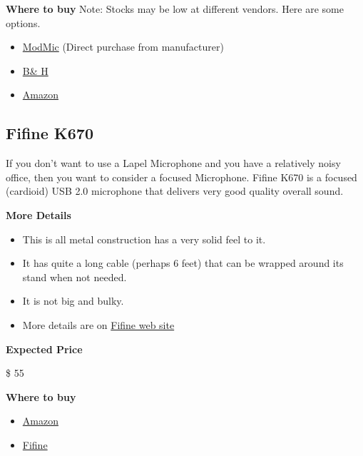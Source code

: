 \begin{gram}
\textbf{Where to buy}
Note: Stocks may be low at different vendors. Here are some options.

\begin{itemize}
	\item \href{https://antlionaudio.com/collections/microphones}{ModMic} (Direct purchase from manufacturer)
	\item \href{https://www.bhphotovideo.com/c/search?Ntt=modmic&N=0&InitialSearch=yes&sts=ma}{B\& H}
	\item \href{https://www.amazon.com/s?k=modmic&ref=nb_sb_noss_1}{Amazon}
\end{itemize}

\end{gram}

\subsection{Fifine K670}
\label{sec:equipment::fifine}

\begin{gram}
\label{grm:equipment::fifine::main}
If you don't want to use a Lapel Microphone and you have a relatively
noisy office, then you want to consider a focused Microphone.
Fifine K670 is a focused (cardioid) USB 2.0 microphone that
delivers very good quality overall sound.

\textbf{More Details}

\begin{itemize}
\item
This is all metal construction has a very solid feel to it.
\item
It has quite a long cable (perhaps 6 feet) that can be wrapped around its stand when not needed.
\item 
It is not big and bulky.
\item
More details are on \href{https://fifinemicrophone.com/products/usb-microphone-for-mac-and-windows-k670}{Fifine web site}
\end{itemize}

\textbf{Expected Price}

\$ 55

\textbf{Where to buy}

\begin{itemize}
\item 
\href{https://www.amazon.com/Microphone-FIFINE-Computers-Podcasting-K670/dp/B079HRFH2Y/ref=asc_df_B079HRFH2Y/?tag=hyprod-20&linkCode=df0&hvadid=380013417597&hvpos=&hvnetw=g&hvrand=6999453823816156640&hvpone=&hvptwo=&hvqmt=&hvdev=c&hvdvcmdl=&hvlocint=&hvlocphy=1025202&hvtargid=pla-878206170477&psc=1&language=en_US&tag=&ref=&adgrpid=77922879259&hvpone=&hvptwo=&hvadid=380013417597&hvpos=&hvnetw=g&hvrand=6999453823816156640&hvqmt=&hvdev=c&hvdvcmdl=&hvlocint=&hvlocphy=1025202&hvtargid=pla-878206170477}{Amazon}
\item \href{https://fifinemicrophone.com/products/usb-microphone-for-mac-and-windows-k670}{Fifine}
\end{itemize}
\end{gram}

